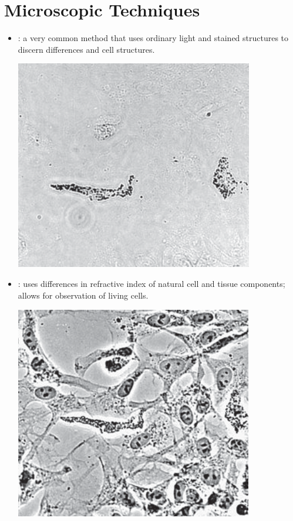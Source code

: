 \section{Microscopic Techniques}
\begin{itemize}
  \item {}: a very common method that uses ordinary light and stained structures to discern differences and cell structures. 
  \begin{center}
    \includegraphics[scale=0.45]{images/week-1-1a.png}
  \end{center}
  \item {}: uses differences in refractive index of natural cell and tissue components; allows for observation of living cells.
  \begin{center}
    \includegraphics[scale=0.45]{images/week-1-1b.png}

\end{center}
\end{itemize}
